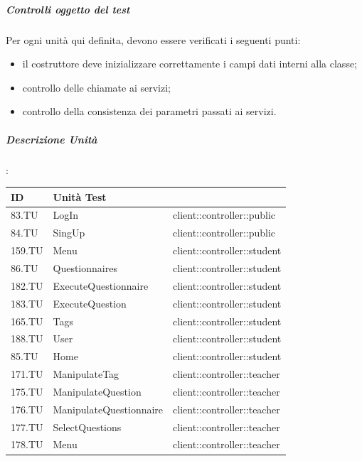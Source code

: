 \documentclass[12pt,a4paper]{article}
\begin{document}
\subparagraph{Controlli oggetto del test}
Per ogni unità  qui definita, devono essere verificati i seguenti punti:

\begin{itemize}
	\item il costruttore deve inizializzare correttamente i campi dati interni alla classe;
	\item controllo delle chiamate ai servizi;
	\item controllo della consistenza dei parametri passati ai servizi.
\end{itemize}

\newpage

\subparagraph{Descrizione Unità}:
\begin{table}[H]
	\begin{center}
		\begin{tabular}{p{} p{} p{}}
			\toprule
			\textbf{ID}   & \textbf{Unità Test}	& \textbf{\mgls{package}} \\ \midrule
			\midrule
			83.TU & LogIn & client::controller::public\\ \midrule
			84.TU & SingUp & client::controller::public\\ \midrule
			159.TU & Menu & client::controller::student\\ \midrule
			86.TU & Questionnaires & client::controller::student\\ \midrule
			182.TU & ExecuteQuestionnaire & client::controller::student\\ \midrule
			183.TU & ExecuteQuestion & client::controller::student\\ \midrule
			165.TU & Tags & client::controller::student\\ \midrule
			188.TU & User & client::controller::student\\ \midrule
			85.TU & Home & client::controller::student\\ \midrule
			171.TU & ManipulateTag & client::controller::teacher\\ \midrule
			175.TU & ManipulateQuestion & client::controller::teacher\\ \midrule
			176.TU & ManipulateQuestionnaire & client::controller::teacher\\ \midrule
			177.TU & SelectQuestions & client::controller::teacher\\ \midrule
			178.TU & Menu & client::controller::teacher\\ \midrule

\end{tabular}
\end{center}
\end{table}
\end{document}
